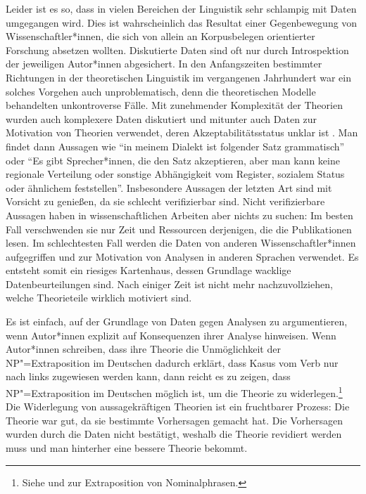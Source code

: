 Leider ist es so, dass in vielen Bereichen der Linguistik sehr schlampig mit Daten
umgegangen wird. Dies ist wahrscheinlich das Resultat einer Gegenbewegung
von Wissenschaftler*innen, die sich von allein an Korpusbelegen orientierter Forschung
absetzen wollten. Diskutierte Daten sind oft nur durch Introspektion der jeweiligen
Autor*innen abgesichert. In den Anfangszeiten bestimmter Richtungen
in der theoretischen Linguistik im vergangenen Jahrhundert war ein solches Vorgehen 
auch unproblematisch, denn die theoretischen Modelle behandelten unkontroverse Fälle.
Mit zunehmender Komplexität der Theorien wurden auch komplexere Daten diskutiert 
und mitunter auch Daten zur Motivation von Theorien verwendet, deren
Akzeptabilitätsstatus unklar ist \citep{Fanselow2004b}.
Man findet dann Aussagen wie "`in meinem Dialekt
ist folgender Satz grammatisch"' oder "`Es gibt Sprecher*innen, die den Satz akzeptieren,
aber man kann keine regionale Verteilung oder sonstige Abhängigkeit vom Register, sozialem
Status oder ähnlichem feststellen"'. Insbesondere Aussagen der letzten Art sind mit Vorsicht
zu genießen, da sie schlecht verifizierbar sind. Nicht verifizierbare Aussagen haben
in wissenschaftlichen Arbeiten aber nichts zu suchen:
Im besten Fall verschwenden sie nur Zeit und Ressourcen derjenigen, die die Publikationen lesen. Im schlechtesten Fall werden die
Daten von anderen Wissenschaftler*innen aufgegriffen und zur Motivation von Analysen in
anderen Sprachen verwendet. Es entsteht somit ein riesiges Kartenhaus, dessen
Grundlage wacklige Datenbeurteilungen sind. Nach einiger Zeit ist nicht mehr nachzuvollziehen,
welche Theorieteile wirklich motiviert sind.

Es ist einfach, auf der Grundlage von Daten gegen Analysen zu argumentieren, wenn Autor*innen
explizit auf Konsequenzen ihrer Analyse hinweisen. Wenn Autor*innen \zb schreiben, dass ihre
Theorie die Unmöglichkeit der NP"=Extraposition im Deutschen dadurch erklärt, dass Kasus vom Verb
nur nach links zugewiesen werden kann, dann reicht es zu zeigen, dass NP"=Extraposition im Deutschen
möglich ist, um die Theorie zu widerlegen.\footnote{
  Siehe  und  zur Extraposition von Nominalphrasen.%
}
Die Widerlegung von aussagekräftigen Theorien ist ein fruchtbarer Prozess: Die Theorie war gut,
da sie bestimmte Vorhersagen gemacht hat. Die Vorhersagen wurden durch die Daten nicht bestätigt,
weshalb die Theorie revidiert werden muss und man hinterher eine bessere Theorie bekommt.

